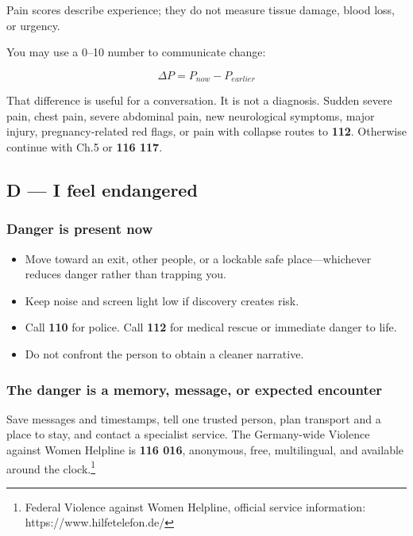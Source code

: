 Pain scores describe experience; they do not measure tissue damage,
blood loss, or urgency.

You may use a 0--10 number to communicate change:

\[\Delta P = P_{now} - P_{earlier}\]

That difference is useful for a conversation. It is not a diagnosis.
Sudden severe pain, chest pain, severe abdominal pain, new neurological
symptoms, major injury, pregnancy-related red flags, or pain with
collapse routes to \textbf{112}. Otherwise continue with Ch.5 or
\textbf{116 117}.

\hypertarget{d-i-feel-endangered}{%
\subsection{D --- I feel endangered}\label{d-i-feel-endangered}}

\hypertarget{danger-is-present-now}{%
\subsubsection{Danger is present now}\label{danger-is-present-now}}

\begin{itemize}
\tightlist
\item
  Move toward an exit, other people, or a lockable safe
  place---whichever reduces danger rather than trapping you.
\item
  Keep noise and screen light low if discovery creates risk.
\item
  Call \textbf{110} for police. Call \textbf{112} for medical rescue or
  immediate danger to life.
\item
  Do not confront the person to obtain a cleaner narrative.
\end{itemize}

\hypertarget{the-danger-is-a-memory-message-or-expected-encounter}{%
\subsubsection{The danger is a memory, message, or expected
encounter}\label{the-danger-is-a-memory-message-or-expected-encounter}}

Save messages and timestamps, tell one trusted person, plan transport
and a place to stay, and contact a specialist service. The Germany-wide
Violence against Women Helpline is \textbf{116 016}, anonymous, free,
multilingual, and available around the clock.\footnote{Federal Violence
  against Women Helpline, official service information:
  https://www.hilfetelefon.de/}

